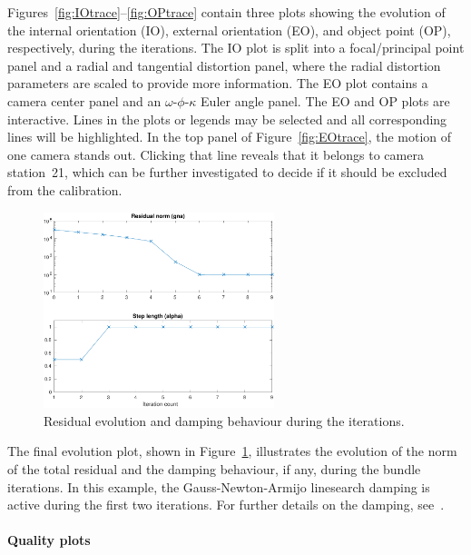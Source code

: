 \documentclass{article}
\begin{document}
Figures~\ref{fig:IOtrace}--\ref{fig:OPtrace} contain three plots showing the
evolution of the internal orientation (IO), external orientation (EO),
and object point (OP), respectively, during the iterations. The IO
plot is split into a focal/principal point panel and a radial and
tangential distortion panel, where the radial distortion parameters
are scaled to provide more information. The EO plot contains a camera
center panel and an \(\omega\)-\(\phi\)-\(\kappa\) Euler angle panel. The EO and
OP plots are interactive. Lines in the plots or legends may be
selected and all corresponding lines will be highlighted. In the top
panel of Figure~\ref{fig:EOtrace}, the motion of one camera stands out.
Clicking that line reveals that it belongs to camera station~21,
which can be further investigated to decide if it should be excluded
from the calibration.

\begin{figure}[tbp]
\centering
\includegraphics[width=0.6\textwidth]{./ill/ccamgnatrace.pdf}
\caption{\label{fig:gnatrace}
Residual evolution and damping behaviour during the iterations.}
\end{figure}

The final evolution plot, shown in Figure~\ref{fig:gnatrace},
illustrates the evolution of the norm of the total residual and the
damping behaviour, if any, during the bundle iterations. In this
example, the Gauss-Newton-Armijo linesearch damping is active during
the first two iterations. For further details on the damping,
see~\citet{Borlin2013:Bundle}.

\paragraph{Quality plots}
\label{sec:org819b08f}
\end{document}
